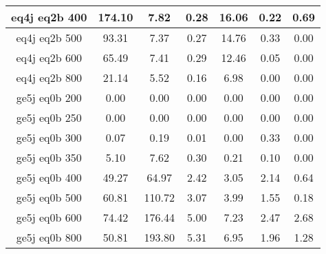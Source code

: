 \begin{longtable}{| c | c | c | c | c | c | c  | }
eq4j eq2b 400 & 174.10 & 7.82 & 0.28 & 16.06 & 0.22 & 0.69\\ \hline 
eq4j eq2b 500 & 93.31 & 7.37 & 0.27 & 14.76 & 0.33 & 0.00\\ \hline 
eq4j eq2b 600 & 65.49 & 7.41 & 0.29 & 12.46 & 0.05 & 0.00\\ \hline 
eq4j eq2b 800 & 21.14 & 5.52 & 0.16 & 6.98 & 0.00 & 0.00\\ \hline 
ge5j eq0b 200 & 0.00 & 0.00 & 0.00 & 0.00 & 0.00 & 0.00\\ \hline 
ge5j eq0b 250 & 0.00 & 0.00 & 0.00 & 0.00 & 0.00 & 0.00\\ \hline 
ge5j eq0b 300 & 0.07 & 0.19 & 0.01 & 0.00 & 0.33 & 0.00\\ \hline 
ge5j eq0b 350 & 5.10 & 7.62 & 0.30 & 0.21 & 0.10 & 0.00\\ \hline 
ge5j eq0b 400 & 49.27 & 64.97 & 2.42 & 3.05 & 2.14 & 0.64\\ \hline 
ge5j eq0b 500 & 60.81 & 110.72 & 3.07 & 3.99 & 1.55 & 0.18\\ \hline 
ge5j eq0b 600 & 74.42 & 176.44 & 5.00 & 7.23 & 2.47 & 2.68\\ \hline 
ge5j eq0b 800 & 50.81 & 193.80 & 5.31 & 6.95 & 1.96 & 1.28\\ \hline 
    \hline 
    \hline 
\end{longtable}

